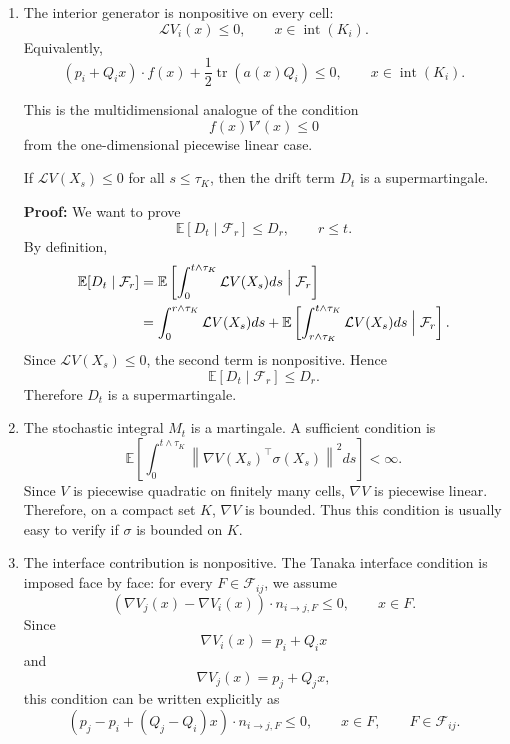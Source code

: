 \begin{enumerate}
\item
The interior generator is nonpositive on every cell:
\[
\mathcal{L}V_i(x) \leq 0,
\qquad x \in \operatorname{int}(K_i).
\]
Equivalently,
\[
(p_i + Q_i x)\cdot f(x)
+
\frac{1}{2}\operatorname{tr}\!\left(a(x)Q_i\right)
\leq 0,
\qquad x \in \operatorname{int}(K_i).
\]

This is the multidimensional analogue of the condition
\[
    f(x)V'(x) \leq 0
\]
from the one-dimensional piecewise linear case.

\begin{fact}
If $\mathcal{L}V(X_s) \leq 0$ for all $s \leq \tau_K$, then the drift term
$D_t$ is a supermartingale.

\textbf{Proof:} We want to prove
\[
    \mathbb{E}[D_t \mid \mathcal{F}_r] \leq D_r,
    \qquad r \leq t.
\]
By definition,
\begin{align}
    \mathbb{E}[D_t \mid \mathcal{F}_r]
    &=
    \mathbb{E}\left[
    \int_0^{t \wedge \tau_K}
    \mathcal{L}V(X_s)ds
    \Bigm| \mathcal{F}_r
    \right] \\
    &=
    \int_0^{r \wedge \tau_K}
    \mathcal{L}V(X_s)ds
    +
    \mathbb{E}\left[
    \int_{r \wedge \tau_K}^{t \wedge \tau_K}
    \mathcal{L}V(X_s)ds
    \Bigm| \mathcal{F}_r
    \right].
\end{align}
Since $\mathcal{L}V(X_s) \leq 0$, the second term is nonpositive. Hence
\[
    \mathbb{E}[D_t \mid \mathcal{F}_r]
    \leq
    D_r.
\]
Therefore $D_t$ is a supermartingale.
\end{fact}

\item
The stochastic integral $M_t$ is a martingale. A sufficient condition is
\[
    \mathbb{E}\left[
    \int_0^{t \wedge \tau_K}
    \left\|
        \nabla V(X_s)^\top \sigma(X_s)
    \right\|^2 ds
    \right]
    < \infty.
\]
Since $V$ is piecewise quadratic on finitely many cells, $\nabla V$ is
piecewise linear. Therefore, on a compact set $K$, $\nabla V$ is bounded.
Thus this condition is usually easy to verify if $\sigma$ is bounded on $K$.

\item
The interface contribution is nonpositive. The Tanaka interface condition is
imposed face by face: for every $F\in\mathcal F_{ij}$, we assume
\[
    \left(
        \nabla V_j(x) - \nabla V_i(x)
    \right)\cdot n_{i\to j,F}
    \leq 0,
    \qquad x \in F.
\]
Since
\[
    \nabla V_i(x) = p_i + Q_i x
\]
and
\[
    \nabla V_j(x) = p_j + Q_j x,
\]
this condition can be written explicitly as
\[
    \left(
        p_j - p_i + (Q_j - Q_i)x
    \right)\cdot n_{i\to j,F}
    \leq 0,
    \qquad x \in F,
    \qquad F\in\mathcal F_{ij}.
\]


\end{enumerate}
